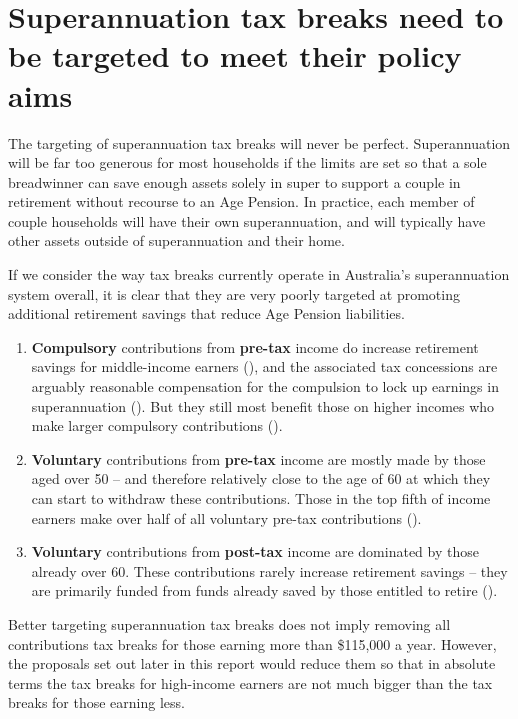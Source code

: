 \documentclass{grattanAlpha}
\begin{document}
\section{Superannuation tax breaks need to be targeted to meet their policy aims}\label{sec:SUPER-3-7}
The targeting of superannuation tax breaks will never be perfect. Superannuation will be far too generous for most households if the limits are set so that a sole breadwinner can save enough assets solely in super to support a couple in retirement without recourse to an Age Pension. In practice, each member of couple households will have their own superannuation, and will typically have other assets outside of superannuation and their home.

If we consider the way tax breaks currently operate in Australia’s superannuation system overall, it is clear that they are very poorly targeted at promoting additional retirement savings that reduce Age Pension liabilities.

\begin{enumerate}
\renewcommand{\ULthickness}{0.66pt}
\renewcommand{\ULdepth}{0.7ex}
\newcommand{\outerbf}[1]{\textcolor{Color5}{#1}}
\newcommand{\emphbf}[1]{\textbf{#1}}
\renewcommand{\labelenumi}{\textbf{\textcolor{Color5}{\arabic{enumi}.~}}}
\item \outerbf{\emphbf{Compulsory} contributions from \emphbf{pre-tax} income} do increase retirement savings for middle-income earners (), and the associated tax concessions are arguably reasonable compensation for the compulsion to lock up earnings in superannuation (). But they still most benefit those on higher incomes who make larger compulsory contributions ().
\item \outerbf{\emphbf{Voluntary} contributions from \emphbf{pre-tax} income} are mostly made by those aged over 50 – and therefore relatively close to the age of 60 at which they can start to withdraw these contributions. Those in the top fifth of income earners make over half of all voluntary pre-tax contributions (). 
\item \outerbf{\emphbf{Voluntary} contributions from \emphbf{post-tax} income} are dominated by those already over 60. These contributions rarely increase retirement savings – they are primarily funded from funds already saved by those entitled to retire (). 
\end{enumerate}


Better targeting superannuation tax breaks does not imply removing all contributions tax breaks for those earning more than \$115,000 a year. However, the proposals set out later in this report would reduce them so that in absolute terms the tax breaks for high-income earners are not much bigger than the tax breaks for those earning less. 
\end{document}
